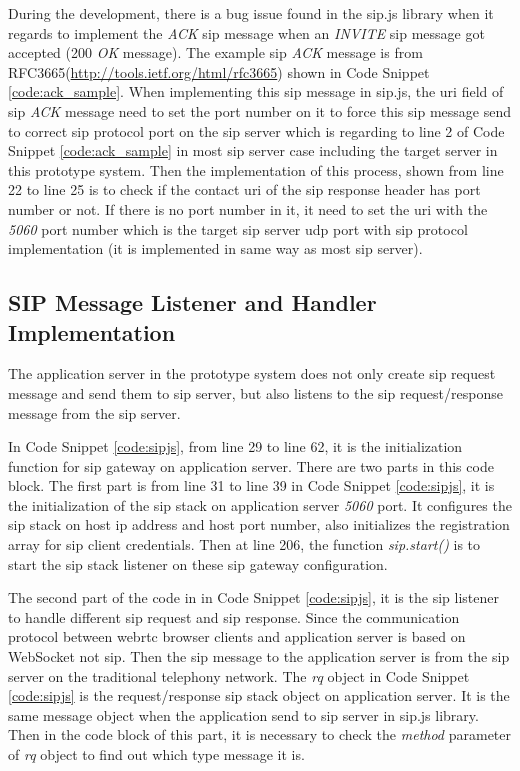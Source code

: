 \par During the development, there is a bug issue found in the sip.js library when it regards to implement the \textit{ACK} \gls{sip} message when an \textit{INVITE} \gls{sip} message got accepted (200 \textit{OK} message). The example \gls{sip} \textit{ACK} message is from RFC3665(\url{http://tools.ietf.org/html/rfc3665}) shown in Code Snippet \ref{code:ack_sample}. When implementing this \gls{sip} message in sip.js, the \gls{uri} field of \gls{sip} \textit{ACK} message need to set the port number on it to force this \gls{sip} message send to correct \gls{sip} protocol port on the \gls{sip} server which is regarding to line 2 of Code Snippet \ref{code:ack_sample} in most \gls{sip} server case including the target server in this prototype system. Then the implementation of this process, shown from line 22 to line 25 is to check if the contact \gls{uri} of the \gls{sip} response header has port number or not. If there is no port number in it, it need to set the \gls{uri} with the \textit{5060} port number which is the target \gls{sip} server \gls{udp} port with \gls{sip} protocol implementation (it is implemented in same way as most \gls{sip} server).

\subsection{SIP Message Listener and Handler Implementation}

\par The application server in the prototype system does not only create \gls{sip} request message and send them to \gls{sip} server, but also listens to the \gls{sip} request/response message from the \gls{sip} server.

In Code Snippet \ref{code:sipjs}, from line 29 to line 62, it is the initialization function for \gls{sip} gateway on application server. There are two parts in this code block. The first part is from line 31 to line 39 in Code Snippet \ref{code:sipjs}, it is the initialization of the \gls{sip} stack on application server \textit{5060} port. It configures the \gls{sip} stack on host \gls{ip} address and host port number, also initializes the registration array for sip client credentials. Then at line 206, the function \textit{sip.start()} is to start the \gls{sip} stack listener on these \gls{sip} gateway configuration. 

\par The second part of the code in in Code Snippet \ref{code:sipjs}, it is the \gls{sip} listener to handle different \gls{sip} request and \gls{sip} response. Since the communication protocol between \gls{webrtc} browser clients and application server is based on WebSocket not \gls{sip}. Then the \gls{sip} message to the application server is from the \gls{sip} server on the traditional telephony network. The \textit{rq} object in Code Snippet \ref{code:sipjs} is the request/response \gls{sip} stack object on application server. It is the same message object when the application send to \gls{sip} server in sip.js library. Then in the code block of this part, it is necessary to check the \textit{method} parameter of \textit{rq} object to find out which type message it is.

